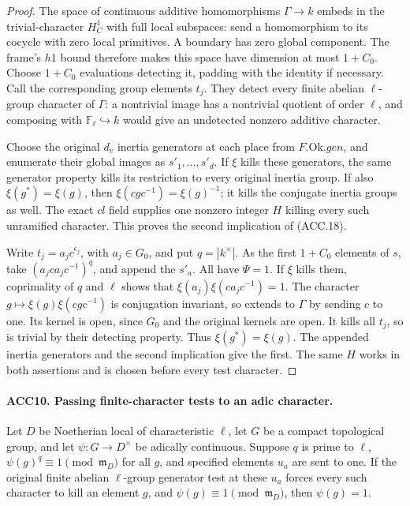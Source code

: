 \begin{proof}
The space of continuous additive homomorphisms \(\Gamma\to k\)
embeds in the trivial-character \(H^1_C\) with full local
subspaces: send a homomorphism to its cocycle with zero local
primitives.  A boundary has zero global component.  The frame's
\(h1\) bound therefore makes this space have dimension at most
\(1+C_0\).  Choose \(1+C_0\) evaluations detecting it, padding
with the identity if necessary.  Call the corresponding group
elements \(t_j\).  They detect every finite abelian
\(\ell\)-group character of \(\Gamma\): a nontrivial image has
a nontrivial quotient of order \(\ell\), and composing with
\(\mathbb F_\ell\hookrightarrow k\) would give an undetected
nonzero additive character.

Choose the original \(d_v\) inertia generators at each place
from \(F.\mathrm{Ok}.gen\), and enumerate their global images
as \(s'_1,\ldots,s'_d\).  If \(\xi\) kills these generators,
the same generator property kills its restriction to every original
inertia group.  If also \(\xi(g^*)=\xi(g)\), then
\(\xi(cgc^{-1})=\xi(g)^{-1}\); it kills the conjugate inertia
groups as well.  The exact \(cl\) field supplies one nonzero
integer \(H\) killing every such unramified character.  This
proves the second implication of (ACC.18).

Write \(t_j=a_jc^{\epsilon_j}\), with \(a_j\in G_0\), and
put \(q=|k^\times|\).  As the first \(1+C_0\) elements of
\(s\), take \((a_jca_jc^{-1})^q\), and append the \(s'_a\).
All have \(\Psi=1\).  If \(\xi\) kills them, coprimality
of \(q\) and \(\ell\) shows that
\(\xi(a_j)\xi(ca_jc^{-1})=1\).  The character
\(g\mapsto\xi(g)\xi(cgc^{-1})\) is conjugation invariant,
so extends to \(\Gamma\) by sending \(c\) to one.  Its
kernel is open, since \(G_0\) and the original kernels are open.
It kills all \(t_j\), so is trivial by their detecting property.
Thus \(\xi(g^*)=\xi(g)\).  The appended inertia generators
and the second implication give the first.  The same \(H\)
works in both assertions and is chosen before every test character.
\end{proof}

\paragraph{ACC10. Passing finite-character tests to an adic character.}
\label{claim:ACC10}
Let \(D\) be Noetherian local of characteristic \(\ell\),
let \(G\) be a compact topological group, and let
\(\psi:G\to D^\times\) be adically continuous.  Suppose
\(q\) is prime to \(\ell\), \(\psi(g)^q\equiv1\pmod{
\mathfrak m_D}\) for all \(g\), and specified elements \(u_a\)
are sent to one.  If the original finite abelian \(\ell\)-group
generator test at these \(u_a\) forces every such character to
kill an element \(g\), and \(\psi(g)\equiv1\pmod{
\mathfrak m_D}\), then \(\psi(g)=1\).

